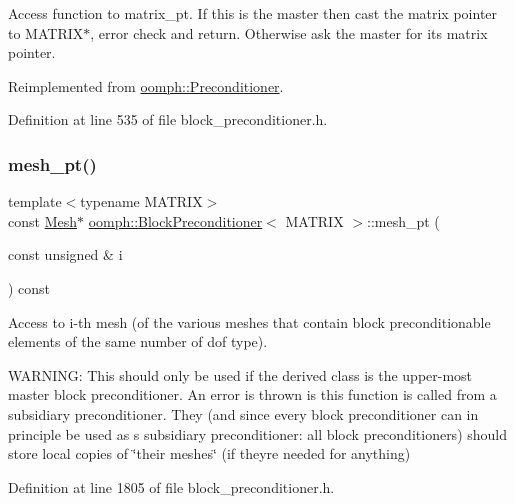 Access function to matrix\+\_\+pt. If this is the master then cast the matrix pointer to M\+A\+T\+R\+I\+X$\ast$, error check and return. Otherwise ask the master for its matrix pointer. 



Reimplemented from \hyperlink{classoomph_1_1Preconditioner_a66726e9df31365df646cdf83a975aa26}{oomph\+::\+Preconditioner}.



Definition at line 535 of file block\+\_\+preconditioner.\+h.

\mbox{\label{classoomph_1_1BlockPreconditioner_a3c0e92cb77c3e3179007fe9fd99b6428}} 
\subsubsection{\texorpdfstring{mesh\+\_\+pt()}{mesh\_pt()}}
{\footnotesize\ttfamily template$<$typename M\+A\+T\+R\+IX$>$ \\
const \hyperlink{classoomph_1_1Mesh}{Mesh}$\ast$ \hyperlink{classoomph_1_1BlockPreconditioner}{oomph\+::\+Block\+Preconditioner}$<$ M\+A\+T\+R\+IX $>$\+::mesh\+\_\+pt (\begin{DoxyParamCaption}\item[{const unsigned \&}]{i }\end{DoxyParamCaption}) const\hspace{0.3cm}{\ttfamily [inline]}}



Access to i-\/th mesh (of the various meshes that contain block preconditionable elements of the same number of dof type). 

W\+A\+R\+N\+I\+NG\+: This should only be used if the derived class is the upper-\/most master block preconditioner. An error is thrown is this function is called from a subsidiary preconditioner. They (and since every block preconditioner can in principle be used as s subsidiary preconditioner\+: all block preconditioners) should store local copies of \char`\"{}their meshes\char`\"{} (if they\textquotesingle{}re needed for anything) 

Definition at line 1805 of file block\+\_\+preconditioner.\+h.

\mbox{\label{classoomph_1_1BlockPreconditioner_a80808d42be8db74fd58af80b019bf317}} 
